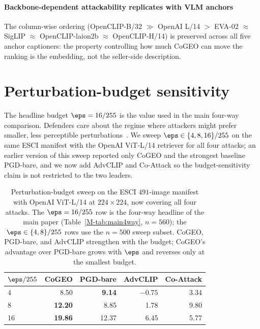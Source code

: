 \paragraph{Backbone-dependent attackability replicates with VLM anchors} The column-wise ordering (OpenCLIP-B/32 $\gg$ OpenAI L/14 $>$ EVA-02 $\approx$ SigLIP $\approx$ OpenCLIP-laion2b $\approx$ OpenCLIP-H/14) is preserved across all five anchor captioners: the property controlling how much CoGEO can move the ranking is the embedding, not the seller-side description.

\section{Perturbation-budget sensitivity}
\label{sm:eps_sweep}

The headline budget $\eps = 16/255$ is the value used in the main four-way comparison. Defenders care about the regime where attackers might prefer smaller, less perceptible perturbations~\cite{kurakin2017physical,wang2004ssim}. We sweep $\eps \in \{4, 8, 16\}/255$ on the same ESCI manifest with the OpenAI ViT-L/14 retriever for all four attacks; an earlier version of this sweep reported only CoGEO and the strongest baseline PGD-bare, and we now add AdvCLIP and Co-Attack so the budget-sensitivity claim is not restricted to the two leaders.

\begin{table}[t]
\centering
\caption{Perturbation-budget sweep on the ESCI $491$-image manifest with OpenAI ViT-L/14 at $224 \times 224$, now covering all four attacks. The $\eps = 16/255$ row is the four-way headline of the main paper (Table~\ref{M-tab:main4way}, $n = 560$); the $\eps \in \{4, 8\}/255$ rows use the $n = 500$ sweep subset. CoGEO, PGD-bare, and AdvCLIP strengthen with the budget; CoGEO's advantage over PGD-bare grows with $\eps$ and reverses only at the smallest budget.}
\label{sm:tab:eps-sweep}
\small
\setlength{\tabcolsep}{4pt}
\begin{tabular}{lrrrr}
\toprule
$\eps / 255$ & CoGEO & PGD-bare & AdvCLIP & Co-Attack \\
\midrule
\phantom{0}4 & ~8.50 & \textbf{~9.14} & $-0.75$ & ~3.34 \\
\phantom{0}8 & \textbf{12.20} & ~8.85 & ~1.78 & ~9.80 \\
16 & \textbf{19.86} & 12.37 & ~6.45 & ~5.77 \\
\bottomrule
\end{tabular}
\end{table}

